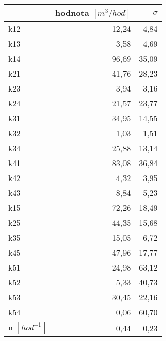 \begin{tabular}{lrr}
\toprule
{} &  hodnota $\left[\si{m^3/hod}\right]$ &  $\sigma$ \\
\midrule
k12                 &                                12,24 &      4,84 \\
k13                 &                                 3,58 &      4,69 \\
k14                 &                                96,69 &     35,09 \\
k21                 &                                41,76 &     28,23 \\
k23                 &                                 3,94 &      3,16 \\
k24                 &                                21,57 &     23,77 \\
k31                 &                                34,95 &     14,55 \\
k32                 &                                 1,03 &      1,51 \\
k34                 &                                25,88 &     13,14 \\
k41                 &                                83,08 &     36,84 \\
k42                 &                                 4,32 &      3,95 \\
k43                 &                                 8,84 &      5,23 \\
k15                 &                                72,26 &     18,49 \\
k25                 &                               -44,35 &     15,68 \\
k35                 &                               -15,05 &      6,72 \\
k45                 &                                47,96 &     17,77 \\
k51                 &                                24,98 &     63,12 \\
k52                 &                                 5,33 &     40,73 \\
k53                 &                                30,45 &     22,16 \\
k54                 &                                 0,06 &     60,70 \\
n $[\si{hod^{-1}}]$ &                                 0,44 &      0,23 \\
\bottomrule
\end{tabular}
